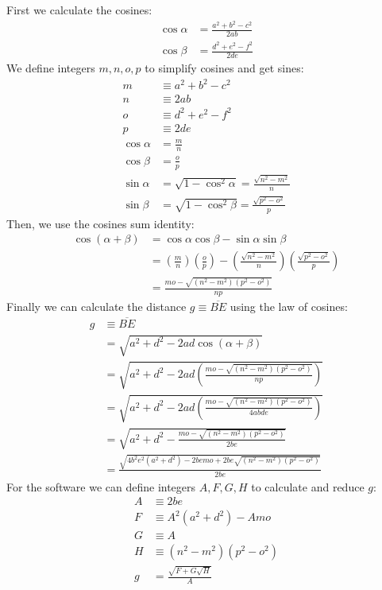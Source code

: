 \documentclass[11pt]{article}
\begin{document}
First we calculate the cosines:
\begin{align}
\cos\alpha &= \frac{a^2 + b^2 - c^2}{2ab}\nonumber\\
\cos\beta  &= \frac{d^2 + e^2 - f^2}{2de}\nonumber
\end{align}
We define integers $m,n,o,p$ to simplify cosines and get sines:
\begin{align}
m &\equiv a^2 + b^2 - c^2\\
n &\equiv 2ab\\
o &\equiv d^2 + e^2 - f^2\\
p &\equiv 2de\\
\cos\alpha &= \frac{m}n\\
\cos\beta  &= \frac{o}p\\
\sin\alpha &= \sqrt{1-\cos^2\alpha} = \frac{\sqrt{n^2 - m^2}}n\\
\sin\beta  &= \sqrt{1-\cos^2\beta} = \frac{\sqrt{p^2 - o^2}}p
\end{align}
Then, we use the cosines sum identity:
\begin{align}
\cos(\alpha+\beta) &= \cos\alpha\cos\beta - \sin\alpha\sin\beta \nonumber\\
 &= \left(\frac{m}n\right)\left(\frac{o}p\right)
  - \left(\frac{\sqrt{n^2 - m^2}}n\right)\left(\frac{\sqrt{p^2 - o^2}}p\right) \nonumber\\
 &= \frac{mo - \sqrt{(n^2 - m^2)(p^2 - o^2)}}{np}
\end{align}
Finally we can calculate the distance $g \equiv \overline{BE}$ using the law of cosines:
\begin{align}
g &\equiv \overline{BE}\nonumber\\
 &= \sqrt{a^2 + d^2 - 2ad\cos(\alpha+\beta)}\nonumber\\
 &= \sqrt{a^2 + d^2 - 2ad\left(\frac{mo - \sqrt{(n^2 - m^2)(p^2 - o^2)}}{np}\right)}\nonumber\\
 &= \sqrt{a^2 + d^2 - 2ad\left(\frac{mo - \sqrt{(n^2 - m^2)(p^2 - o^2)}}{4abde}\right)}\nonumber\\
 &= \sqrt{a^2 + d^2 - \frac{mo - \sqrt{(n^2 - m^2)(p^2 - o^2)}}{2be}}\nonumber\\
 &= \frac{\sqrt{4b^2e^2(a^2 + d^2) - 2bemo + 2be\sqrt{(n^2 - m^2)(p^2 - o^2)}}}{2be}
\end{align}
For the software we can define integers $A,F,G,H$ to calculate and reduce $g$:
\begin{align}
A &\equiv 2be\\
F &\equiv A^2(a^2+d^2) - Amo\\
G &\equiv A\\
H &\equiv (n^2-m^2)(p^2-o^2)\\
g &= \frac{\sqrt{F+G\sqrt{H}}}A
\end{align}
\end{document}
